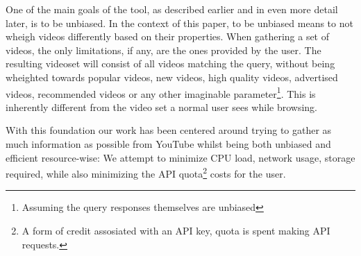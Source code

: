 One of the main goals of the tool, as described earlier and in even more detail
later, is to be unbiased. In the context of this paper, to be unbiased means
to not wheigh videos differently based on their properties. When gathering a
set of videos, the only limitations, if any, are the ones provided by the user.
The resulting videoset will consist of all videos matching the query, without
being wheighted towards popular videos, new videos, high quality videos, 
advertised videos, recommended videos or any other imaginable
parameter\footnote{Assuming the query responses themselves are unbiased}. This
is inherently different from the video set a normal user sees while browsing.

With this foundation our work has been centered around trying to gather as much
information as possible from YouTube whilst being both unbiased and efficient
resource-wise: We attempt to minimize CPU load, network usage, storage required,
while also minimizing the API quota\footnote{A form of credit assosiated with an API key, quota is spent making
API requests.} costs for the user.

